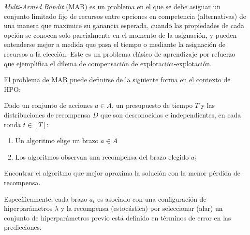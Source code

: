 \textit{Multi-Armed Bandit} (MAB) es un problema en el que se debe asignar un conjunto limitado fijo de recursos entre opciones en competencia (alternativas) de una manera que maximice su ganancia esperada, cuando las propiedades de cada opción se conocen solo parcialmente en el momento de la asignación, y pueden entenderse mejor a medida que pasa el tiempo o mediante la asignación de recursos a la elección. Este es un problema clásico de aprendizaje por refuerzo que ejemplifica el dilema de compensación de exploración-explotación.

El problema de MAB puede definirse de la siguiente forma en el contexto de HPO:

\begin{definition}

Dado un conjunto de acciones $a \in A$, un presupuesto de tiempo $T$ y las distribuciones de recompensa $D$ que son desconocidas e independientes, en cada ronda $t \in [T]$:

\begin{enumerate}
	\item Un algoritmo elige un brazo $a \in A$
	\item Los algoritmos observan una recompensa del brazo elegido $a_t$
\end{enumerate}

Encontrar el algoritmo que mejor aproxima la solución con la menor pérdida de recompensa.

\end{definition}

Específicamente, cada brazo $a_t$ es asociado con una configuración de hiperparámetros $\lambda$ y la recompensa (estocástica) por seleccionar (alar) un conjunto de hiperparámetros previo está definido en términos de error en las predicciones.

